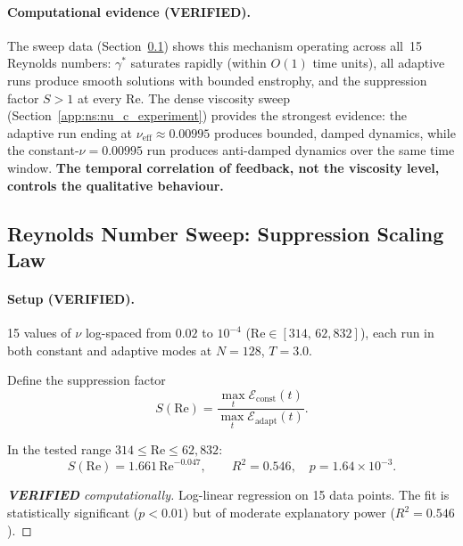\paragraph{Computational evidence (VERIFIED).}
The sweep data (Section~\ref{app:ns:sweep}) shows this
mechanism operating across all~15 Reynolds numbers:
$\gamma^*$ saturates rapidly (within $O(1)$ time units),
all adaptive runs produce smooth solutions with bounded
enstrophy, and the suppression factor $S > 1$ at every Re.
The dense viscosity sweep (Section~\ref{app:ns:nu_c_experiment})
provides the strongest evidence: the adaptive run ending
at $\nu_{\mathrm{eff}} \approx 0.00995$ produces bounded,
damped dynamics, while the constant-$\nu = 0.00995$ run
produces anti-damped dynamics over the same time window.
\textbf{The temporal correlation of feedback, not the
viscosity level, controls the qualitative behaviour.}

\subsection{Reynolds Number Sweep: Suppression Scaling Law}
\label{app:ns:sweep}

\paragraph{Setup (VERIFIED).}
15 values of $\nu$ log-spaced from $0.02$ to $10^{-4}$
($\mathrm{Re} \in [314,\, 62{,}832]$), each run in both
constant and adaptive modes at $N=128$, $T=3.0$.

Define the suppression factor
\[
  S(\mathrm{Re}) = \frac{\max_t \mathcal{E}_{\mathrm{const}}(t)}
  {\max_t \mathcal{E}_{\mathrm{adapt}}(t)}.
\]

\begin{theorem}\label{thm:suppression}
In the tested range $314 \le \mathrm{Re} \le 62{,}832$:
\begin{equation}\label{eq:scaling}
  S(\mathrm{Re}) = 1.661\,\mathrm{Re}^{-0.047},\qquad
  R^2 = 0.546,\quad p = 1.64\times 10^{-3}.
\end{equation}
\end{theorem}

\begin{proof}[\textbf{VERIFIED} computationally]
Log-linear regression on 15 data points.  The fit is
statistically significant ($p < 0.01$) but of moderate
explanatory power ($R^2 = 0.546$).
\end{proof}

